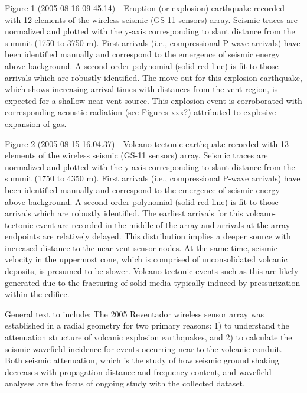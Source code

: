 
Figure 1 (2005-08-16 09 45.14) - Eruption (or explosion) earthquake
recorded with 12 elements of the wireless seismic (GS-11 sensors)
array.  Seismic traces are normalized and plotted with the y-axis
corresponding to slant distance from the summit (1750 to 3750 m).
First arrivals (i.e., compressional P-wave arrivals) have been
identified manually and correspond to the emergence of seismic energy
above background.  A second order polynomial (solid red line) is fit
to those arrivals which are robustly identified.  The move-out for
this explosion earthquake, which shows increasing arrival times with
distances from the vent region, is expected for a shallow near-vent
source.  This explosion event is corroborated with corresponding
acoustic radiation (see Figures xxx?) attributed to explosive
expansion of gas.

Figure 2 (2005-08-15 16.04.37) - Volcano-tectonic earthquake recorded
with 13 elements of the wireless seismic (GS-11 sensors) array.
Seismic traces are normalized and plotted with the y-axis
corresponding to slant distance from the summit (1750 to 4350 m).
First arrivals (i.e., compressional P-wave arrivals) have been
identified manually and correspond to the emergence of seismic energy
above background.  A second order polynomial (solid red line) is fit
to those arrivals which are robustly identified.  The earliest
arrivals for this volcano-tectonic event are recorded in the middle of
the array and arrivals at the array endpoints are relatively delayed.
This distribution implies a deeper source with increased distance to
the near vent sensor nodes.  At the same time, seismic velocity in the
uppermost cone, which is comprised of unconsolidated volcanic
deposits, is presumed to be slower.  Volcano-tectonic events such as
this are likely generated due to the fracturing of solid media
typically induced by pressurization within the edifice.

General text to include:
The 2005 Reventador wireless sensor array was established in a radial
geometry for two primary reasons: 1) to understand the attenuation
structure of volcanic explosion earthquakes, and 2) to calculate the
seismic wavefield incidence for events occurring near to the volcanic
conduit.  Both seismic attenuation, which is the study of how seismic
ground shaking decreases with propagation distance and frequency
content, and wavefield analyses are the focus of ongoing study with
the collected dataset.  

